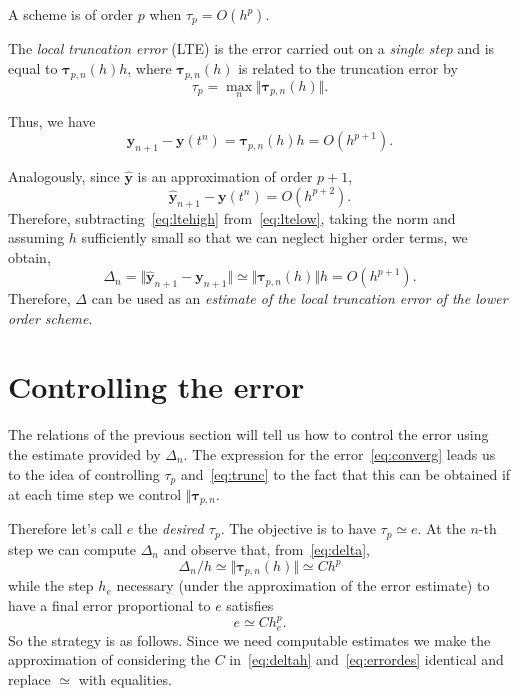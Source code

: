 \documentclass[10pt,a4paper,twoside]{article}
\begin{document}
A scheme is of order $p$ when $\tau_p=O(h^p)$.

The \emph{local truncation error} (LTE) is the error carried out on a \emph{single step} and is equal to $\boldsymbol{\tau}_{p,n}(h) h$, where $\boldsymbol{\tau}_{p,n}(h)$ is related to the truncation error by 
\begin{equation}\label{eq:trunc}
\tau_p=\max_n \Vert\boldsymbol{\tau}_{p,n}(h)\Vert.
\end{equation}

Thus, we have 
\begin{equation}\label{eq:ltelow}
\mathbf{y}_{n+1}-\mathbf{y}(t^n) = \boldsymbol\tau_{p,n}(h) h =O(h^{p+1}).
\end{equation}

Analogously, since $\hat{\mathbf{y}}$ is an approximation of order $p+1$,
\begin{equation}\label{eq:ltehigh}
\hat{\mathbf{y}}_{n+1}-\mathbf{y}(t^n) =O(h^{p+2}).
\end{equation}
Therefore, subtracting~\eqref{eq:ltehigh} from~\eqref{eq:ltelow}, taking the norm and assuming $h$ sufficiently small so that we can neglect higher order terms, we obtain,
\begin{equation}\label{eq:delta}
\Delta_n=\Vert \hat{\mathbf{y}}_{n+1}-\mathbf{y}_{n+1} \Vert\simeq \Vert \boldsymbol\tau_{p,n}(h)\Vert  h= O(h^{p+1}).
\end{equation}
Therefore, $\Delta$ can be used as an \emph{estimate of the local truncation error of the lower order scheme}.
\section{Controlling the error}
The relations of the previous section will tell us how to control the error using the estimate provided by $\Delta_n$. The expression for the error~\eqref{eq:converg}
 leads us to the idea of controlling $\tau_p$ and~\eqref{eq:trunc} to the fact that this can be obtained if at each time step we control $\Vert\boldsymbol{\tau}_{p,n}$.
 
 Therefore let's call $e$ the \emph{desired $\tau_p$}. The objective is to have 
 $\tau_p\simeq e$. At the $n$-th step we can compute $\Delta_n$ and observe that, from~\eqref{eq:delta},
\begin{equation}\label{eq:deltah}
\Delta_n/h \simeq \Vert \boldsymbol\tau_{p,n}(h)\Vert \simeq C h^{p}
\end{equation}
while the step $h_e$ necessary (under the approximation of the error estimate) to have a final error proportional to $e$ satisfies
\begin{equation}\label{eq:errordes}
e\simeq C h_e^p.
\end{equation}
So the strategy is as follows. Since we need computable estimates we make the approximation 
of considering the  $C$ in~\eqref{eq:deltah} and~\eqref{eq:errordes} identical and replace $\simeq$ with equalities. 
\end{document}
